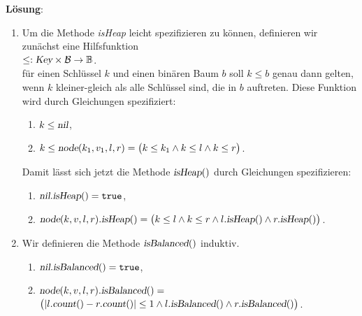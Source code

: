 \documentclass{article}
\begin{document}
\noindent
\textbf{L\"osung}:
\begin{enumerate}
\item Um die Methode \textsl{isHeap} leicht spezifizieren zu k\"onnen, definieren wir zun\"achst
      eine Hilfsfunktion
      \\[0.2cm]
      \hspace*{1.3cm}
      $\leq : \textsl{Key} \times \mathcal{B} \rightarrow \mathbb{B}$.
      \\[0.2cm]
      f\"ur einen Schl\"ussel $k$ und einen bin\"aren Baum $b$ soll $k \leq b$ genau dann gelten,
      wenn $k$ kleiner-gleich als alle Schl\"ussel sind, die in $b$ auftreten.
      Diese Funktion wird durch Gleichungen spezifiziert:
      \begin{enumerate}
      \item $k \leq \textsl{nil}$,
      \item $k \leq \textsl{node}(k_1,v_1,l,r) = \bigl(k \leq k_1 \wedge k \leq l \wedge k \leq r\bigr)$.
      \end{enumerate}
      Damit l\"asst sich jetzt die Methode $\textsl{isHeap}()$ durch Gleichungen spezifizieren:
      \begin{enumerate}
      \item $\textsl{nil}.\textsl{isHeap}() = \mathtt{true}$,
      \item $\textsl{node}(k,v,l,r).\textsl{isHeap}() = 
             \bigl(k \leq l \wedge k \leq r \wedge l.\textsl{isHeap}() \wedge r.\textsl{isHeap}()\bigr)$.
      \end{enumerate}
\item Wir definieren die Methode $\textsl{isBalanced}()$ induktiv.
      \begin{enumerate}
      \item $\textsl{nil}.\textsl{isBalanced}() = \mathtt{true}$,
      \item $\textsl{node}(k,v,l,r).\textsl{isBalanced}() =$ \\[0.1cm]
            \hspace*{\fill}
            $\bigl(|l.\textsl{count}() - r.\textsl{count}()| \leq 1 
             \wedge l.\textsl{isBalanced}()\wedge r.\textsl{isBalanced}()\bigr)$.
      \end{enumerate}
\end{enumerate}
\vspace{0.3cm}
\end{document}

